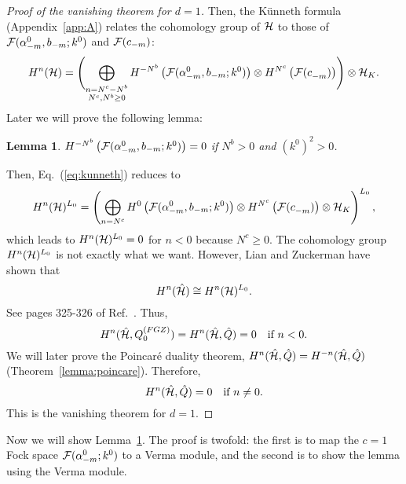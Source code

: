 \documentclass[a4paper,12pt]{article}
\newcommand{\eq}[1]{(\ref{eq:#1})}
\newcommand{\cond}[1]{\quad\mbox{#1}}
\newcommand{\hQ}{\hat{Q}}
\newtheorem{lemma}{Lemma}[section]
\begin{document}
\begin{proof}[Proof of the vanishing theorem for $d=1$]
Then, the K\"{u}nneth
formula (Appendix~\ref{app:A}) relates the cohomology group of ${\cal H}$ to
those of ${\cal F}(\alpha^{0}_{-m}, b_{-m};k^0)$ and ${\cal F}(c_{-m})$:
\begin{equation}
%
H^{n}({\cal H}) =
\Biggl(
\bigoplus_{\stackrel{\scriptstyle n=N^{c}-N^{b}}{N^{c}, N^{b} \geq 0}}
                H^{-N^{b}}\left({\cal F}(\alpha^{0}_{-m}, b_{-m};k^0)\right)
                \otimes
                H^{N^{c}}\left({\cal F}(c_{-m}^{})\right)
\Biggr)
\otimes {\cal H}_K.
                \label{eq:kunneth}
%
\end{equation}
Later we will prove the following lemma:
\begin{lemma}
%
$ H^{-N^{b}}\left({\cal F}(\alpha^{0}_{-m}, b_{-m};k^0)\right) = 0 $ if
$N^{b} > 0$ and $(k^0)^2>0$.
\label{lemma4.1}
%
\end{lemma}
\noindent Then, Eq.~\eq{kunneth} reduces to
\begin{equation}
%
H^{n}({\cal H})^{L_0} =
                \left(
                \bigoplus_{n=N^{c} }
                H^{0}\left({\cal F}(\alpha^{0}_{-m}, b_{-m};k^0)\right)
                \otimes
                H^{N^{c}}\left({\cal F}(c_{-m}^{})\right)
                \otimes {\cal H}_K \right)^{L_0},
%
\end{equation}
which leads to $H^{n}({\cal H})^{L_0} = 0$ for $n < 0$ because $N^c\geq 0$.
The cohomology group $H^{n}({\cal H})^{L_0}$ is not exactly what we want.
However, Lian and Zuckerman have shown that
\begin{equation}
H^n(\hat{\cal H}) \cong H^n({\cal H})^{L_0}.
\end{equation}
See pages 325-326 of Ref.~\cite{LZ}. Thus,
\begin{equation}
%
H^{n}(\hat{\cal H}, Q^{(FGZ)}_{0}) = H^{n}(\hat{\cal H}, \hQ) = 0 
\cond{if $n<0$.}
%
\end{equation}
We will later prove the Poincar\'{e} duality theorem,
$ H^{n}(\hat{\cal H}, \hQ) = H^{-n}(\hat{\cal H}, \hQ) $
(Theorem~\ref{lemma:poincare}). Therefore,
\begin{equation}
%
H^{n}(\hat{\cal H}, \hQ) = 0 \cond{if $n \neq 0$.}
%
\end{equation}
This is the vanishing theorem for $d=1$.
\end{proof}

Now we will show Lemma~\ref{lemma4.1}. The proof is twofold: the first
is to
map the $c=1$ Fock space ${\cal F}(\alpha^{0}_{-m};k^0)$ to a Verma module, and the second is to show the lemma
using the Verma module. 
\end{document}

